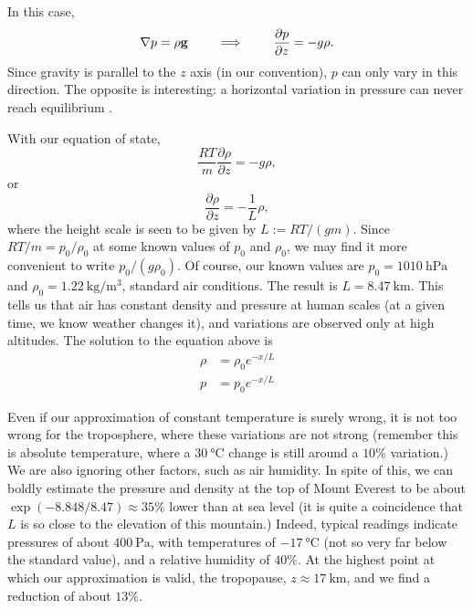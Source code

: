 In this case,
\[
\nabla p = \rho \mathbf{g} \qquad\implies\qquad
\frac{\partial p}{\partial z} = -g \rho .
\]
Since gravity is parallel to the $z$ axis (in our convention), $p$ can
only vary in this direction. The opposite is interesting: a horizontal
variation in pressure can never reach equilibrium
\cite{landau2013fluid}.

With our equation of state,
\[
\frac{ R T}{m} \frac{\partial \rho}{\partial z} = -g \rho ,
\]
or
\[
\frac{\partial \rho}{\partial z} = -\frac{1}{L} \rho ,
\]
where the height scale is seen to be given by $L:=RT/(gm)$. Since
$RT/m= p_0/\rho_0$ at some known values of $p_0$ and $\rho_0$, we may
find it more convenient to write $p_0/(g \rho_0)$. Of course, our
known values are $p_0=\SI{1010}{\hecto\pascal}$ and
$\rho_0=\SI{1.22}{\kilo\gram\per\meter\cubed}$, standard air
conditions. The result is $L=\SI{8.47}{\kilo\meter}$. This tells us
that air has constant density and pressure at human scales (at a given
time, we know weather changes it), and variations are observed only at
high altitudes. The solution to the equation above is
\begin{align*}
  \rho &= \rho_0 e^{-x/L} \\
  p &= p_0 e^{-x/L}
\end{align*}

Even if our approximation of constant temperature is surely wrong, it
is not too wrong for the troposphere, where these variations are not
strong (remember this is absolute temperature, where a
$\SI{30}{\celsius}$ change is still around a $10\%$ variation.) We are
also ignoring other factors, such as air humidity.  In spite of this,
we can boldly estimate the pressure and density at the top of Mount
Everest to be about $\exp( - 8.848 / 8.47 ) \approx 35 \%$ lower than
at sea level (it is quite a coincidence that $L$ is so close to the
elevation of this mountain.) Indeed, typical readings indicate
pressures of about $\SI{400}{\pascal}$, with temperatures of
$\SI{-17}{\celsius}$ (not so very far below the standard value), and a
relative humidity of $40\%$. At the highest point at which our
approximation is valid, the tropopause,
$z\approx\SI{17}{\kilo\meter}$, and we find a reduction of about
$13\%$.

